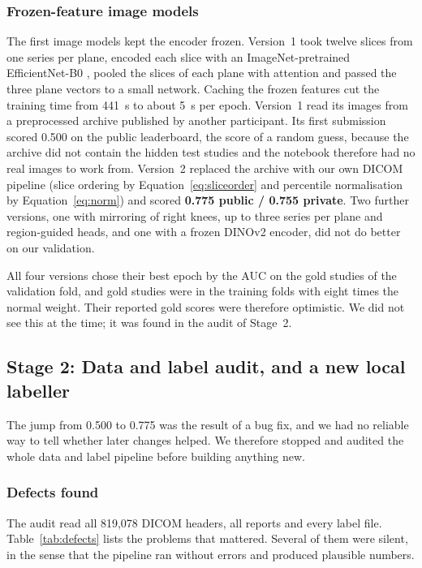 \subsubsection{Frozen-feature image models} The first image models kept the encoder frozen. Version~1 took twelve slices from one series per plane, encoded each slice with an ImageNet-pretrained EfficientNet-B0 \cite{tan2019effnet}, pooled the slices of each plane with attention and passed the three plane vectors to a small network. Caching the frozen features cut the training time from 441~s to about 5~s per epoch. Version~1 read its images from a preprocessed archive published by another participant. Its first submission scored 0.500 on the public leaderboard, the score of a random guess, because the archive did not contain the hidden test studies and the notebook therefore had no real images to work from. Version~2 replaced the archive with our own DICOM pipeline (slice ordering by Equation~\eqref{eq:sliceorder} and percentile normalisation by Equation~\eqref{eq:norm}) and scored \textbf{0.775 public / 0.755 private}. Two further versions, one with mirroring of right knees, up to three series per plane and region-guided heads, and one with a frozen DINOv2 encoder, did not do better on our validation.

All four versions chose their best epoch by the AUC on the gold studies of the validation fold, and gold studies were in the training folds with eight times the normal weight. Their reported gold scores were therefore optimistic. We did not see this at the time; it was found in the audit of Stage~2.

\subsection{Stage 2: Data and label audit, and a new local labeller}
\label{sec:impl-audit}

The jump from 0.500 to 0.775 was the result of a bug fix, and we had no reliable way to tell whether later changes helped. We therefore stopped and audited the whole data and label pipeline before building anything new.

\subsubsection{Defects found} The audit read all 819,078 DICOM headers, all reports and every label file. Table~\ref{tab:defects} lists the problems that mattered. Several of them were silent, in the sense that the pipeline ran without errors and produced plausible numbers.

